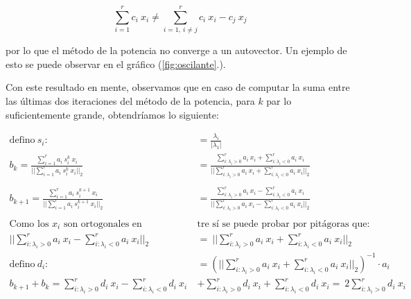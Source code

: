 \begin{equation*}
    \sum_{i=1}^{r} c_i\ x_i \neq \sum_{i = 1,\ i \neq j}^{r} c_i\ x_i - c_j\ x_j
\end{equation*}

\noindent por lo que el método de la potencia no converge a un autovector. 
Un ejemplo de esto se puede observar en el gráfico (\ref{fig:oscilante}.).

\vspace{1em}
Con este resultado en mente, observamos que en caso de computar la suma entre las últimas dos iteraciones del método de la potencia, para $k$ par lo suficientemente grande, obtendríamos lo siguiente:


\begin{align*}
    \text{defino} \ s_i :&= \frac{\lambda_{i}}{|\lambda_{1}|} \\
    b_k = \frac{\sum_{i=1}^{r} a_i \ s_i^k \ x_i }{||\sum_{i=1}^{r} a_i \ s_i^k \ x_i||_2} &= \frac{\sum_{i: \lambda_i > 0}^{r} a_i \ x_i  + \sum_{i: \lambda_i < 0}^{r} a_i \ x_i}{||\sum_{i: \lambda_i > 0}^{r} a_i \ x_i  + \sum_{i: \lambda_i < 0}^{r} a_i \ x_i||_2} \\\\
    b_{k+1} = \frac{\sum_{i=1}^{r} a_i \ s_i^{k+1} \ x_i }{||\sum_{i=1}^{r} a_i \ s_i^{k+1} \ x_i||_2} &= \frac{\sum_{i: \lambda_i > 0}^{r} a_i \ x_i - \sum_{i: \lambda_i < 0}^{r} a_i \ x_i}{||\sum_{i: \lambda_i > 0}^{r} a_i \ x_i  - \sum_{i: \lambda_i < 0}^{r} a_i \ x_i||_2} \\\\
    \text{Como los $x_i$ son ortogonales en}& \text{tre sí se puede probar por pitágoras que:} \\ 
    ||\sum_{i: \lambda_i > 0}^{r} a_i \ x_i  - \sum_{i: \lambda_i < 0}^{r} a_i \ x_i||_2 &=  \ ||\sum_{i: \lambda_i > 0}^{r} a_i \ x_i  + \sum_{i: \lambda_i < 0}^{r} a_i \ x_i||_2 \\
    \text{defino} \ d_i :&= (||\sum_{i: \lambda_i > 0}^{r} a_i \ x_i  + \sum_{i: \lambda_i < 0}^{r} a_i \ x_i||_2)^{-1} \cdot a_i \\
    b_{k+1} + b_k = \sum_{i: \lambda_i > 0}^{r} d_i \ x_i - \sum_{i: \lambda_i < 0}^{r} d_i \ x_i \ &+ \sum_{i: \lambda_i > 0}^{r} d_i \ x_i + \sum_{i: \lambda_i < 0}^{r} d_i \ x_i = \ 2 \sum_{i: \lambda_i > 0}^{r} d_i \ x_i \\
\end{align*}


